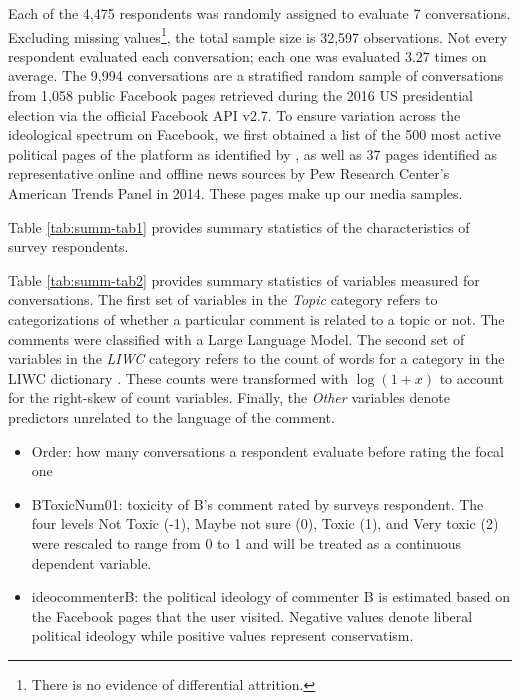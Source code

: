 \documentclass{article}
\begin{document}
Each of the 4,475 respondents was randomly assigned to evaluate 7 conversations. Excluding missing values\footnote{There is no evidence of differential attrition.}, the total sample size is 32,597 observations. Not every respondent evaluated each conversation; each one was evaluated 3.27 times on average. The 9,994 conversations are a stratified random sample of conversations from 1,058 public Facebook pages retrieved during the 2016 US presidential election via the official Facebook API v2.7. To ensure variation across the ideological spectrum on Facebook, we first obtained a list of the 500 most active political pages of the platform as identified by \citet{bakshy_exposure_2015}, as well as 37 pages identified as representative online and offline news sources by Pew Research Center’s American Trends Panel in 2014. These pages make up our media samples.

Table \ref{tab:summ-tab1} provides summary statistics of the characteristics of survey respondents.


Table \ref{tab:summ-tab2} provides summary statistics of variables measured for conversations. The first set of variables in the \textit{Topic} category refers to categorizations of whether a particular comment is related to a topic or not. The comments were classified with a Large Language Model.
The second set of variables in the \textit{LIWC} category refers to the count of words for a category in the LIWC dictionary \citep{pennebaker_linguistic_2022}. These counts were transformed with $\log(1+x)$ to account for the right-skew of count variables. Finally, the \textit{Other} variables denote predictors unrelated to the language of the comment. 

\begin{itemize}
    \item Order: how many conversations a respondent evaluate before rating the focal one
    \item BToxicNum01: toxicity of B's comment rated by surveys respondent. The four levels Not Toxic (-1), Maybe not sure (0), Toxic (1), and Very toxic (2) were rescaled to range from 0 to 1 and will be treated as a continuous dependent variable.
    \item ideocommenterB: the political ideology of commenter B is estimated based on the Facebook pages that the user visited. Negative values denote liberal political ideology while positive values represent conservatism.
\end{itemize}
\end{document}
